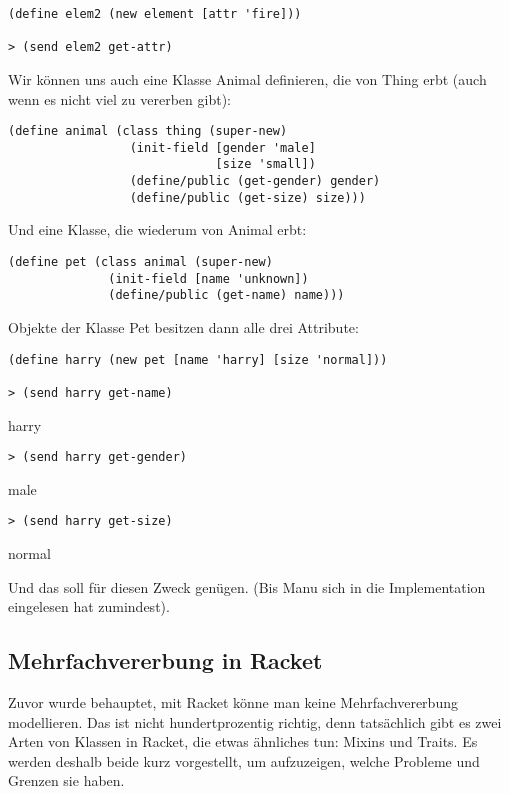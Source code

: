 \begin{lstlisting}
(define elem2 (new element [attr 'fire]))

> (send elem2 get-attr)
\end{lstlisting} 
{}

Wir können uns auch eine Klasse Animal definieren, die von Thing erbt (auch wenn es nicht viel zu vererben gibt):

\begin{lstlisting}
(define animal (class thing (super-new)
                 (init-field [gender 'male]
                             [size 'small])
                 (define/public (get-gender) gender)
                 (define/public (get-size) size)))
\end{lstlisting} 

Und eine Klasse, die wiederum von Animal erbt:

\begin{lstlisting}
(define pet (class animal (super-new)
              (init-field [name 'unknown])
              (define/public (get-name) name)))
\end{lstlisting} 

Objekte der Klasse Pet besitzen dann alle drei Attribute:

\begin{lstlisting}
(define harry (new pet [name 'harry] [size 'normal]))

> (send harry get-name)
\end{lstlisting} 
{\rsymbol harry}

\begin{lstlisting}
> (send harry get-gender)
\end{lstlisting} 
{\rsymbol male}

\begin{lstlisting}
> (send harry get-size)
\end{lstlisting} 
{\rsymbol normal}


Und das soll für diesen Zweck genügen. (Bis Manu sich in die Implementation eingelesen hat zumindest). %

\subsection{Mehrfachvererbung in Racket}
Zuvor wurde behauptet, mit Racket könne man keine Mehrfachvererbung modellieren. Das ist nicht hundertprozentig richtig, denn tatsächlich gibt es zwei Arten von Klassen in Racket, die etwas ähnliches tun: Mixins und Traits. Es werden deshalb beide kurz vorgestellt, um aufzuzeigen, welche Probleme und Grenzen sie haben.

